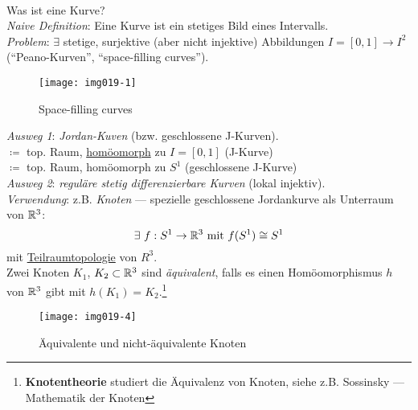 \begin{remark}
  \label{exkurs:kurve}
  \ \\
  \begin{minipage}{.45\textwidth}
    \vspace{0.1cm}
    Was ist eine Kurve? \\
    \emph{Naive Definition}: Eine Kurve ist ein stetiges Bild eines Intervalls. \\
    \emph{Problem}: $ \exists $ stetige, surjektive (aber nicht injektive) Abbildungen $ I = [0,1] \to I^2 $ (``Peano-Kurven'', ``space-filling curves'')\footnotemark.
    \vspace{0.1cm}
  \end{minipage}
  \hfill
  \begin{minipage}{.45\textwidth}
    \vspace{0.1cm}  
    \begin{figure}[H]
      \label{img019-1}
      \texttt{[image: img019-1]}
      \caption{Space-filling curves}
    \end{figure}
    \vspace{0.1cm}
  \end{minipage}
  \emph{Ausweg 1}: \emph{Jordan-Kuven} (bzw. geschlossene J-Kurven). \\
    $ \coloneqq $ top. Raum, \hyperref[def:homoeomorphismus]{homöomorph} zu $ I = [0,1] $ (J-Kurve) \\
    $ \coloneqq $ top. Raum, homöomorph zu $ S^1 $ (geschlossene J-Kurve) \\
  \emph{Ausweg 2}: \emph{reguläre stetig differenzierbare Kurven} (lokal injektiv). \\
  \emph{Verwendung}: z.B. \emph{Knoten} --- spezielle geschlossene Jordankurve als Unterraum von $ \mathbb{R}^3 $:
  \begin{equation*}
    \exists \ f : S^1 \to \mathbb{R}^3 \text{ mit } f(S^1) \cong S^1
  \end{equation*}
  mit \hyperref[def:teilraumtopologie]{Teilraumtopologie} von $ R^3 $. \\
  Zwei Knoten $ K_1 $, $ K_2 \subset \mathbb{R}^3 $ sind \emph{äquivalent}, falls es einen Homöomorphismus $ h $ von $ \mathbb{R}^3 $ gibt mit $ h(K_1) = K_2 $.\footnote{\textbf{Knotentheorie} studiert die Äquivalenz von Knoten, siehe z.B. Sossinsky --- Mathematik der Knoten}
  \begin{figure}[H]
    \label{img019-4}
    \texttt{[image: img019-4]}
    \caption{Äquivalente und nicht-äquivalente Knoten}
  \end{figure}
\end{remark}

